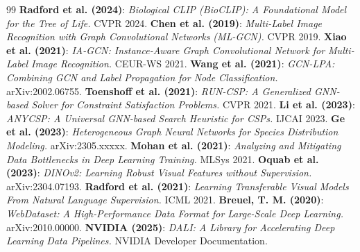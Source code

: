 \documentclass[10pt,twocolumn,letterpaper]{article}
\begin{document}
\begin{thebibliography}{99}
     \textbf{Radford et al. (2024)}: \textit{Biological CLIP (BioCLIP): A Foundational Model for the Tree of Life.} CVPR 2024.
 \textbf{Chen et al. (2019)}: \textit{Multi-Label Image Recognition with Graph Convolutional Networks (ML-GCN).} CVPR 2019.
 \textbf{Xiao et al. (2021)}: \textit{IA-GCN: Instance-Aware Graph Convolutional Network for Multi-Label Image Recognition.} CEUR-WS 2021.
 \textbf{Wang et al. (2021)}: \textit{GCN-LPA: Combining GCN and Label Propagation for Node Classification.} arXiv:2002.06755.
 \textbf{Toenshoff et al. (2021)}: \textit{RUN-CSP: A Generalized GNN-based Solver for Constraint Satisfaction Problems.} CVPR 2021.
 \textbf{Li et al. (2023)}: \textit{ANYCSP: A Universal GNN-based Search Heuristic for CSPs.} IJCAI 2023.
 \textbf{Ge et al. (2023)}: \textit{Heterogeneous Graph Neural Networks for Species Distribution Modeling.} arXiv:2305.xxxxx.
 \textbf{Mohan et al. (2021)}: \textit{Analyzing and Mitigating Data Bottlenecks in Deep Learning Training.} MLSys 2021.
 \textbf{Oquab et al. (2023)}: \textit{DINOv2: Learning Robust Visual Features without Supervision.} arXiv:2304.07193.
 \textbf{Radford et al. (2021)}: \textit{Learning Transferable Visual Models From Natural Language Supervision.} ICML 2021.
 \textbf{Breuel, T. M. (2020)}: \textit{WebDataset: A High-Performance Data Format for Large-Scale Deep Learning.} arXiv:2010.00000.
 \textbf{NVIDIA (2025)}: \textit{DALI: A Library for Accelerating Deep Learning Data Pipelines.} NVIDIA Developer Documentation.
\end{thebibliography}
\end{document}
